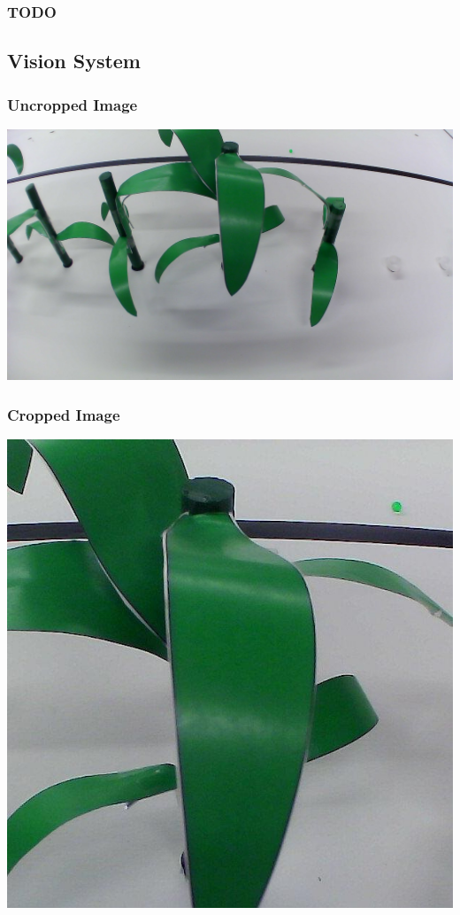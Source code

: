 \documentclass[11pt, twoside]{report}
\begin{document}
\subsubsection{TODO}


\subsection{Vision System} \label{app:vision}
\subsubsection{Uncropped Image} \label{app:uncrop}
	\begin{center}
	\includegraphics[scale=.2]{uncropped.jpg}
	\end{center}

\subsubsection{Cropped Image} \label{app:crop}
	\begin{center}
	\includegraphics[scale=.2]{cropped.jpg}
	\end{center}
	
\end{document}
